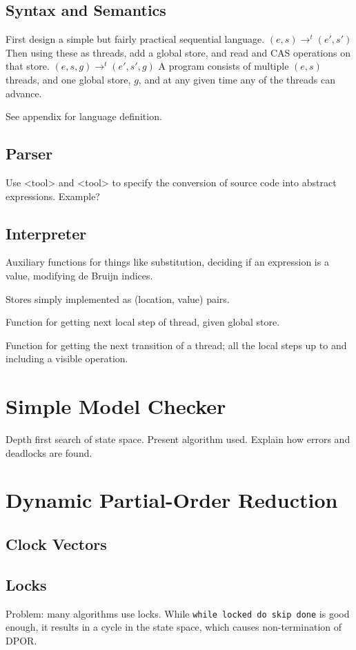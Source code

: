 \documentclass[12pt,a4paper,twoside,openright]{report}
\begin{document}
\subsection{Syntax and Semantics}
First design a simple but fairly practical sequential language.
$(e, s) \longrightarrow^t (e', s')$
Then using these as threads, add a global store, and read and CAS
operations on that store.
$(e, s, g) \longrightarrow^t (e', s', g)$
A program consists of multiple $(e, s)$ threads, and one global store,
$g$, and at any given time any of the threads can advance.

See appendix for language definition.

\subsection{Parser}
Use <tool> and <tool> to specify the conversion of source code
into abstract expressions. Example?

\subsection{Interpreter}
Auxiliary functions for things like substitution, deciding if
an expression is a value, modifying de Bruijn indices.

Stores simply implemented as (location, value) pairs.

Function for getting next local step of thread, given global store.

Function for getting the next transition of a thread; all the local
steps up to and including a visible operation.

\section{Simple Model Checker}

Depth first search of state space. Present algorithm used.
Explain how errors and deadlocks are found.

\section{Dynamic Partial-Order Reduction}

\subsection{Clock Vectors}
\subsection{Locks}
Problem: many algorithms use locks. While \texttt{while locked do skip done}
is good enough, it results in a cycle in the state space, which causes
non-termination of DPOR.
\end{document}

